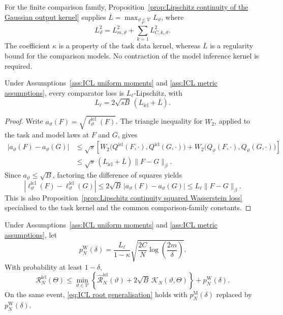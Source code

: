 For the finite comparison family, Proposition~\ref{prop:Lipschitz continuity of the Gaussian output kernel} supplies \(\overline L=\max_{\vartheta\in\mathcal V}L_\vartheta\), where
\[
L_\vartheta^2=L_{m,\vartheta}^2+\sum_{k=1}^rL_{C,k,\vartheta}^2.
\]
The coefficient \(\kappa\) is a property of the task data kernel, whereas \(\overline L\) is a regularity bound for the comparison models. No contraction of the model inference kernel is required.

\begin{lemma}
\label{lem:ICL Lipschitz loss}
Under Assumptions~\ref{ass:ICL uniform moments} and \ref{ass:ICL metric assumptions}, every comparator loss is \(L_\ell\)-Lipschitz, with
\begin{equation}
\label{eq:ICL Lipschitz constant}
L_\ell=2\sqrt{sB}\,(L_{\mathrm{icl}}+\overline L).
\end{equation}
\end{lemma}

\begin{proof}
Write \(a_\vartheta(F)=\sqrt{\ell_\vartheta^{\mathrm{icl}}(F)}\). The triangle inequality for \(W_2\), applied to the task and model laws at \(F\) and \(G\), gives
\[
\begin{aligned}
|a_\vartheta(F)-a_\vartheta(G)|
&\leqslant\sqrt s\left[
W_2\bigl(Q^{\mathrm{icl}}(F,\cdot),Q^{\mathrm{icl}}(G,\cdot)\bigr)
+W_2\bigl(Q_\vartheta(F,\cdot),Q_\vartheta(G,\cdot)\bigr)\right]\\
&\leqslant\sqrt s\,(L_{\mathrm{icl}}+\overline L)\|F-G\|_\beta.
\end{aligned}
\]
Since \(a_\vartheta\leqslant\sqrt B\), factoring the difference of squares yields
\[
|\ell_\vartheta^{\mathrm{icl}}(F)-\ell_\vartheta^{\mathrm{icl}}(G)|
\leqslant2\sqrt B\,|a_\vartheta(F)-a_\vartheta(G)|
\leqslant L_\ell\|F-G\|_\beta.
\]
This is also Proposition~\ref{prop:Lipschitz continuity squared Wasserstein loss} specialised to the task kernel and the common comparison-family constants.
\end{proof}

\begin{theorem}
\label{thm:ICL metric bound}
Under Assumptions~\ref{ass:ICL uniform moments} and \ref{ass:ICL metric assumptions}, let
\begin{equation}
\label{eq:ICL metric penalty}
p_N^{\mathrm W}(\delta)
=\frac{L_\ell}{1-\kappa}
\sqrt{\frac{2C}{N}\log\left(\frac{2m}{\delta}\right)}.
\end{equation}
With probability at least \(1-\delta\),
\begin{equation}
\label{eq:ICL metric bound}
\mathcal R_N^{\mathrm{icl}}(\Theta)
\leqslant\min_{\vartheta\in\mathcal V}
\left\{\widehat{\mathcal R}_N^{\mathrm{icl}}(\vartheta)
+2\sqrt B\,\mathcal K_N(\vartheta,\Theta)\right\}
+p_N^{\mathrm W}(\delta).
\end{equation}
On the same event, \eqref{eq:ICL root generalisation} holds with \(p_N^{\mathrm M}(\delta)\) replaced by \(p_N^{\mathrm W}(\delta)\).
\end{theorem}

